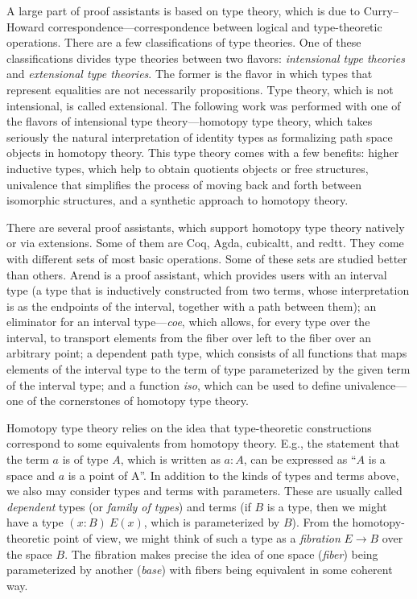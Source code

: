 A large part of proof assistants is based on type theory, which is due to Curry–Howard correspondence---correspondence between logical and type-theoretic operations. There are a few classifications of type theories. One of these classifications divides type theories between two flavors: \textit{intensional type theories} and \textit{extensional type theories}. The former is the flavor in which types that represent equalities are not necessarily propositions. Type theory, which is not intensional, is called extensional. The following work was performed with one of the flavors of intensional type theory---homotopy type theory, which takes seriously the natural interpretation of identity types as formalizing path space objects in homotopy theory. This type theory comes with a few benefits: higher inductive types, which help to obtain quotients objects or free structures, univalence that simplifies the process of moving back and forth between isomorphic structures, and a synthetic approach to homotopy theory.

There are several proof assistants, which support homotopy type theory natively or via extensions. Some of them are Coq\autocite{Coq}, Agda\autocite{Agda}, cubicaltt\autocite{Cubicaltt}, and redtt\autocite{Redtt}. They come with different sets of most basic operations. Some of these sets are studied better than others. Arend\autocite{Arend} is a proof assistant, which provides users with an interval type (a type that is inductively constructed from two terms, whose interpretation is as the endpoints of the interval, together with a path between them); an eliminator for an interval type---\textit{coe}, which allows, for every type over the interval, to transport elements from the fiber over left to the fiber over an arbitrary point; a dependent path type, which consists of all functions that maps elements of the interval type to the term of type parameterized by the given term of the interval type; and a function \textit{iso}, which can be used to define univalence---one of the cornerstones of homotopy type theory\autocite{Arenddocs}\autocite{nlab}.

Homotopy type theory relies on the idea that type-theoretic constructions correspond to some equivalents from homotopy theory. E.g., the statement that the term $a$ is of type $A$, which is written as $a:A$, can be expressed as ``$A$ is a space and $a$ is a point of A''. In addition to the kinds of types and terms above, we also may consider types and terms with parameters. These are usually called \textit{dependent} types (or \textit{family of types}) and terms (if $B$ is a type, then we might have a type $(x:B)\ E(x)$, which is parameterized by $B$). From the homotopy-theoretic point of view, we might think of such a type as a \textit{fibration} $E \to B$ over the space $B$. The fibration makes precise the idea of one space (\textit{fiber}) being parameterized by another (\textit{base}) with fibers being equivalent in some coherent way.

